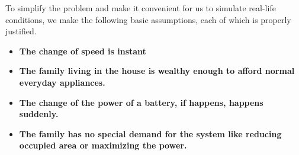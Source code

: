 \documentclass[12pt]{article}
\begin{document}
To simplify the problem and make it convenient for us to simulate real-life conditions, we make the following basic assumptions, each of which is properly justified.

\begin{itemize}
    \item {\bf The change of speed is instant}
    \item {\bf The family living in the house is wealthy enough to afford normal everyday appliances.}

    \item {\bf The change of the power of a battery, if happens,  happens suddenly.}

    \item {\bf The family has no special demand for the system like reducing occupied area or maximizing the power.}

\end{itemize}
\end{document}
